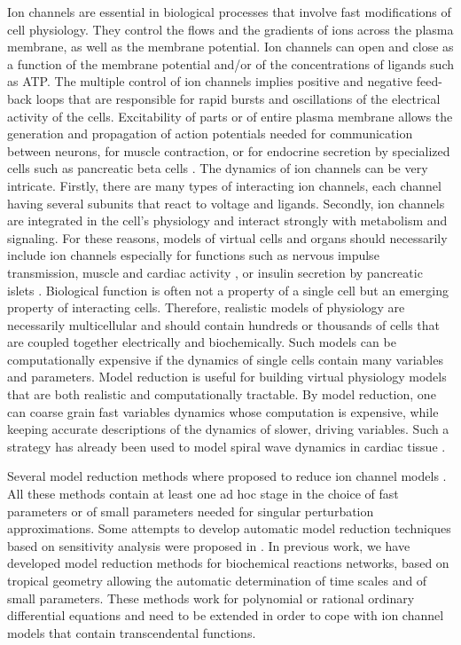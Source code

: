 \documentclass{llncs}
\begin{document}
Ion channels are essential in biological
processes that involve fast modifications of cell physiology. They control
the flows and the gradients of ions across the plasma membrane, as well as the membrane potential. Ion channels
can open and close  as a function of the  membrane potential
and/or of the concentrations of ligands such as ATP. The multiple control of ion channels
implies positive and negative feed-back loops that are responsible for rapid bursts and
oscillations of the electrical activity of the cells. Excitability of parts or of entire plasma
membrane allows the generation and  propagation of
action potentials needed for communication between neurons, for muscle
contraction, or for endocrine secretion by specialized cells such as
pancreatic beta cells \cite{hille2001ion,fridlyand2009model,fridlyand2013ion}.
The dynamics of ion channels can be very intricate. Firstly, there are many types of
interacting ion channels, each channel having several subunits that react to voltage and
ligands. Secondly, ion channels are integrated in the cell's physiology and
interact strongly with metabolism and signaling.
For these reasons, models of virtual cells and organs should necessarily include ion channels
especially for functions such as nervous impulse transmission, muscle and cardiac activity \cite{iyer2004computational}, or
insulin secretion by pancreatic islets \cite{fridlyand2016pancreatic}. Biological function is often not a property of
a single cell but an emerging property of interacting cells. Therefore, realistic
models of physiology are necessarily multicellular and should contain hundreds or
thousands of cells that are coupled together electrically and biochemically.
Such models can be computationally expensive if the dynamics of single cells contain
many variables and parameters. Model reduction is useful for
building virtual physiology models that are both realistic and computationally
tractable. By model reduction, one can coarse grain
fast variables dynamics whose computation is expensive, while
keeping accurate descriptions of the dynamics of slower, driving variables.
 {Such a strategy has already been used to model spiral wave dynamics in
cardiac tissue \cite{bueno2008minimal}.}

Several model reduction methods where proposed to reduce ion channel models
\cite{biktasheva2006asymptotic,suckley2003asymptotic,grosu2011cardiac,murthy2012approximate}.
All these methods contain at least one ad hoc stage
in the choice of fast parameters or of small parameters needed for singular
perturbation approximations.
Some attempts to develop automatic model reduction techniques
 based on sensitivity analysis were proposed in \cite{clewley2004dominant,clewley2005computational}.
In previous work, we have developed model reduction methods
for biochemical reactions networks,
based on tropical geometry \cite{NGVR12sasb,radulescu2012frontiers,Noel2013a,soliman2014constraint,radulescu2015symbolic,radulescu2015,samal2015geometric}
allowing the automatic determination of time scales
and of small parameters.
These methods work
for polynomial or rational ordinary differential equations and need to be
extended in order to cope with ion channel models that contain
transcendental functions.
\end{document}
